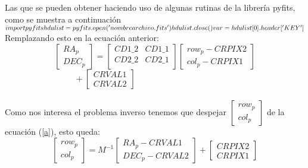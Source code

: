 \documentclass[twocolumn]{AS4201}
\begin{document}
Las que se pueden obtener haciendo uso de algunas rutinas de la librería pyfits, como se muestra a continuación\\
$\\
import pyfits 
\\
hdulist = pyfits.open('nombrearchivo.fits')\\
hdulist.close()\\
var=hdulist[0].header['KEY']\\
$\\
Remplazando esto en la ecuación anterior:
\begin{equation}\label{a}
 	\left[\begin{array}{c}
 	    RA_p \\DEC_p 
	\end{array}\right] 
	=
	\left[\begin{array}{cc}
		CD1\_2 & CD1\_1\\ 
		CD2\_2 & CD2\_1\\
	\end{array}\right] 
	\left[\begin{array}{c}
 	    row_p-CRPIX2 \\col_p-CRPIX1
	\end{array}\right] 		
\end{equation}
$
\hspace{100pt}
+
	\left[\begin{array}{c}
 	    CRVAL1 \\CRVAL2
	\end{array}\right] 
$\\
\\
Como nos interesa el problema inverso tenemos que despejar	
$\left[\begin{array}{c}
row_p \\col_p
 \end{array}\right]$ 
de la ecuación (\ref{a}), esto queda:
\begin{equation}\nonumber
 	\left[\begin{array}{c}
 	    row_p \\col_p 
	\end{array}\right] 
	=M^{-1} 	
	\left[\begin{array}{c}
 	    RA_p-CRVAL1\\DEC_p-CRVAL2
	\end{array}\right] 	
	+
	\left[\begin{array}{c}
 	    CRPIX2\\CRPIX1
	\end{array}\right] 
\end{equation}
\end{document}
